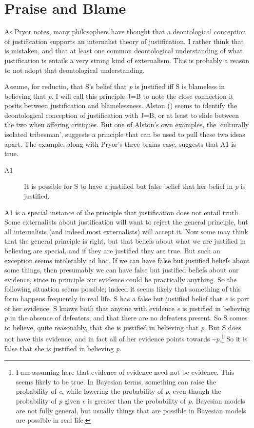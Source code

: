 \documentclass[
  11pt,
  letterpaper,
  DIV=11,
  numbers=noendperiod,
  twoside]{scrartcl}
\begin{document}
\section{Praise and Blame}\label{praise-and-blame}

As Pryor notes, many philosophers have thought that a deontological
conception of justification supports an internalist theory of
justification. I rather think that is mistaken, and that at least one
common deontological understanding of what justification is entails a
very strong kind of externalism. This is probably a reason to not adopt
that deontological understanding.

Assume, for reductio, that S's belief that \emph{p} is justified iff S
is blameless in believing that \emph{p}. I will call this principle J=B
to note the close connection it posits between justification and
blamelessness. Alston () seems to
identify the deontological conception of justification with J=B, or at
least to slide between the two when offering critiques. But one of
Alston's own examples, the `culturally isolated tribesman', suggests a
principle that can be used to pull these two ideas apart. The example,
along with Pryor's three brains case, suggests that A1 is true.

\begin{description}
\item[A1]
It is possible for S to have a justified but false belief that her
belief in \emph{p} is justified.
\end{description}

A1 is a special instance of the principle that justification does not
entail truth. Some externalists about justification will want to reject
the general principle, but all internalists (and indeed most
externalists) will accept it. Now some may think that the general
principle is right, but that beliefs about what we are justified in
believing are special, and if they are justified they are true. But such
an exception seems intolerably ad hoc. If we can have false but
justified beliefs about some things, then presumably we can have false
but justified beliefs about our evidence, since in principle our
evidence could be practically anything. So the following situation seems
possible; indeed it seems likely that something of this form happens
frequently in real life. S has a false but justified belief that
\emph{e} is part of her evidence. S knows both that anyone with evidence
\emph{e} is justified in believing \emph{p} in the absence of defeaters,
and that there are no defeaters present. So S comes to believe, quite
reasonably, that she is justified in believing that \emph{p}. But S does
not have this evidence, and in fact all of her evidence points towards
\textasciitilde{}\emph{p}.\footnote{I am assuming here that evidence of
  evidence need not be evidence. This seems likely to be true. In
  Bayesian terms, something can raise the probability of \emph{e}, while
  lowering the probability of \emph{p}, even though the probability of
  \emph{p} given \emph{e} is greater than the probability of \emph{p}.
  Bayesian models are not fully general, but usually things that are
  possible in Bayesian models are possible in real life.} So it is false
that she is justified in believing \emph{p}.
\end{document}
